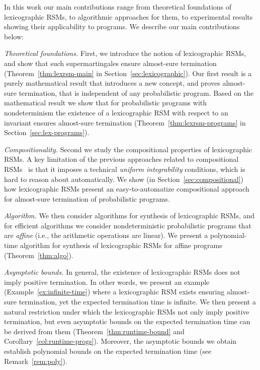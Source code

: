 \smallskip{} 
In this work our main contributions range from theoretical foundations of lexicographic
RSMs, to algorithmic approaches for them, to experimental results
showing their applicability to programs.
We describe our main contributions below:
\begin{compactenum}

\item {\em Theoretical foundations.} 
First, we introduce the notion of lexicographic RSMs, and show that
such supermartingales ensure almost-sure termination (Theorem~\ref{thm:lexrsm-main} in 
Section~\ref{sec:lexicographic}). 
Our first result is a purely mathematical result that introduces a new concept, and 
proves almost-sure termination, that is independent of any probabilistic program.
Based on the mathematical result we show that for probabilistic programs with 
nondeterminism
the existence of a lexicographic RSM with respect to an invariant ensures
almost-sure termination (Theorem~\ref{thm:lexrsm-programs} in 
Section~\ref{sec:lex-programs}).

\item {\em Compositionality.} 
Second we study the compositional properties of lexicographic RSMs.
A key limitation of the previous approaches related to compositional 
RSMs~\cite{HolgerPOPL} is that it imposes a technical \emph{uniform 
integrability} conditions, which is hard to reason about automatically. We show 
(in Section~\ref{sec:compositional}) how 
lexicographic RSMs 
present an easy-to-automatize compositional approach for almost-sure 
termination of probabilistic programs.

\item {\em Algorithm.} We then consider algorithms for synthesis of lexicographic RSMs, 
and for efficient algorithms we consider nondeterministic probabilistic 
programs that are {\em affine} (i.e., the arithmetic operations are linear).
We present a polynomial-time algorithm for synthesis of lexicographic RSMs 
for affine programs (Theorem~\ref{thm:algo}).


\item {\em Asymptotic bounds.} 
In general, the existence of lexicographic RSMs does not imply positive
termination. 
In other words, we present an example (Example~\ref{ex:infinite-time}) where a 
lexicographic RSM exists ensuring
almost-sure termination, yet the expected termination time is infinite.
We then present a natural restriction under which the lexicographic 
RSMs not only imply positive termination, but even asymptotic bounds on the expected termination 
time can be derived from them (Theorem~\ref{thm:runtime-bound} and 
Corollary~\ref{col:runtime-progs}).
Moreover, the asymptotic bounds we obtain establish polynomial bounds on the expected termination 
time (see Remark~\ref{rem:poly}).



\end{compactenum}
